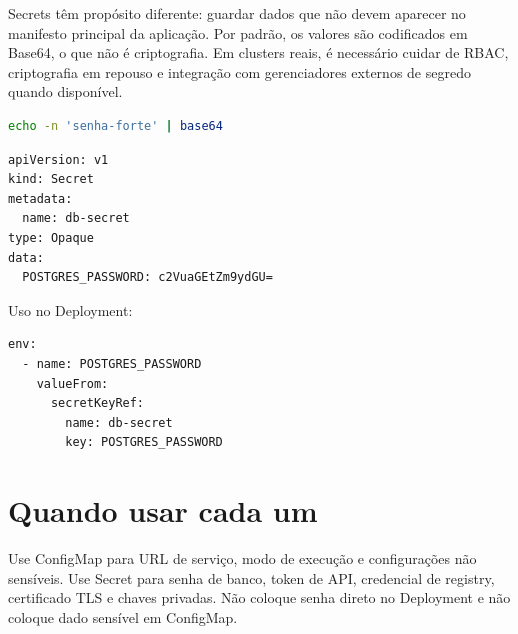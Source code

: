 \documentclass[11pt,a4paper]{article}
\begin{document}
Secrets têm propósito diferente: guardar dados que não devem aparecer no manifesto principal da aplicação. Por padrão, os valores são codificados em Base64, o que não é criptografia. Em clusters reais, é necessário cuidar de RBAC, criptografia em repouso e integração com gerenciadores externos de segredo quando disponível.

\begin{lstlisting}[language=bash]
echo -n 'senha-forte' | base64
\end{lstlisting}

\begin{lstlisting}[language=bash]
apiVersion: v1
kind: Secret
metadata:
  name: db-secret
type: Opaque
data:
  POSTGRES_PASSWORD: c2VuaGEtZm9ydGU=
\end{lstlisting}

Uso no Deployment:

\begin{lstlisting}[language=bash]
env:
  - name: POSTGRES_PASSWORD
    valueFrom:
      secretKeyRef:
        name: db-secret
        key: POSTGRES_PASSWORD
\end{lstlisting}

\section*{\color{primary}Quando usar cada um}

Use ConfigMap para URL de serviço, modo de execução e configurações não sensíveis. Use Secret para senha de banco, token de API, credencial de registry, certificado TLS e chaves privadas. Não coloque senha direto no Deployment e não coloque dado sensível em ConfigMap.
\end{document}
